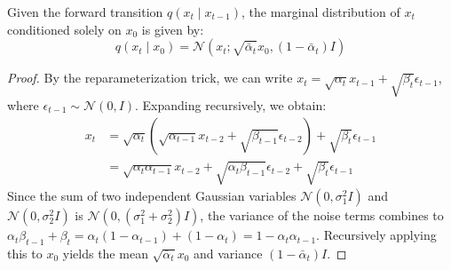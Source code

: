 \begin{lemma}
Given the forward transition $q(x_t \mid x_{t-1})$, the marginal distribution of $x_t$ conditioned solely on $x_0$ is given by:
\begin{equation}
    q(x_t \mid x_0) = \mathcal{N}(x_t; \sqrt{\bar{\alpha}_t} x_0, (1 - \bar{\alpha}_t) I)
\end{equation}
\end{lemma}
\begin{proof}
By the reparameterization trick, we can write $x_t = \sqrt{\alpha_t} x_{t-1} + \sqrt{\beta_t} \epsilon_{t-1}$, where $\epsilon_{t-1} \sim \mathcal{N}(0, I)$. Expanding recursively, we obtain:
\begin{align*}
    x_t &= \sqrt{\alpha_t} (\sqrt{\alpha_{t-1}} x_{t-2} + \sqrt{\beta_{t-1}} \epsilon_{t-2}) + \sqrt{\beta_t} \epsilon_{t-1} \\
        &= \sqrt{\alpha_t \alpha_{t-1}} x_{t-2} + \sqrt{\alpha_t \beta_{t-1}} \epsilon_{t-2} + \sqrt{\beta_t} \epsilon_{t-1}
\end{align*}
Since the sum of two independent Gaussian variables $\mathcal{N}(0, \sigma_1^2 I)$ and $\mathcal{N}(0, \sigma_2^2 I)$ is $\mathcal{N}(0, (\sigma_1^2 + \sigma_2^2) I)$, the variance of the noise terms combines to $\alpha_t \beta_{t-1} + \beta_t = \alpha_t (1 - \alpha_{t-1}) + (1 - \alpha_t) = 1 - \alpha_t \alpha_{t-1}$. Recursively applying this to $x_0$ yields the mean $\sqrt{\bar{\alpha}_t} x_0$ and variance $(1 - \bar{\alpha}_t) I$.
\end{proof}

